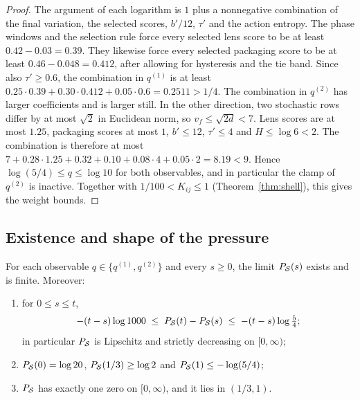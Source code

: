 \begin{proof}
The argument of each logarithm is $1$ plus a nonnegative combination of the final variation, the selected scores, $b'/12$, $\tau'$ and the action entropy. The phase windows and the selection rule force every selected lens score to be at least $0.42-0.03=0.39$. They likewise force every selected packaging score to be at least $0.46-0.048=0.412$, after allowing for hysteresis and the tie band. Since also $\tau'\ge0.6$, the combination in $q^{(1)}$ is at least $0.25\cdot0.39+0.30\cdot0.412+0.05\cdot0.6=0.2511>1/4$. The combination in $q^{(2)}$ has larger coefficients and is larger still. In the other direction, two stochastic rows differ by at most $\sqrt2$ in Euclidean norm, so $v_f\le\sqrt{2d}<7$. Lens scores are at most $1.25$, packaging scores at most $1$, $b'\le12$, $\tau'\le4$ and $H\le\log6<2$. The combination is therefore at most $7+0.28\cdot1.25+0.32+0.10+0.08\cdot4+0.05\cdot2=8.19<9$. Hence $\log(5/4)\le q\le\log10$ for both observables, and in particular the clamp of $q^{(2)}$ is inactive. Together with $1/100<K_{ij}\le1$ (Theorem~\ref{thm:shell}), this gives the weight bounds.
\end{proof}

\subsection{Existence and shape of the pressure}

\begin{theorem}\label{thm:pressure}
For each observable $q\in\{q^{(1)},q^{(2)}\}$ and every $s\ge0$, the limit $P_{\mathcal{S}}(s)$ exists and is finite. Moreover:
\begin{enumerate}
  \item for $0\le s\le t$,
  \[
  -(t-s)\log 1000\;\le\;P_{\mathcal{S}}(t)-P_{\mathcal{S}}(s)\;\le\;-(t-s)\log\tfrac54;
  \]
  in particular $P_{\mathcal{S}}$ is Lipschitz and strictly decreasing on $[0,\infty)$;
  \item $P_{\mathcal{S}}(0)=\log 20$, $P_{\mathcal{S}}(1/3)\ge\log 2$ and $P_{\mathcal{S}}(1)\le-\log(5/4)$;
  \item $P_{\mathcal{S}}$ has exactly one zero on $[0,\infty)$, and it lies in $(1/3,1)$.
\end{enumerate}
\end{theorem}

